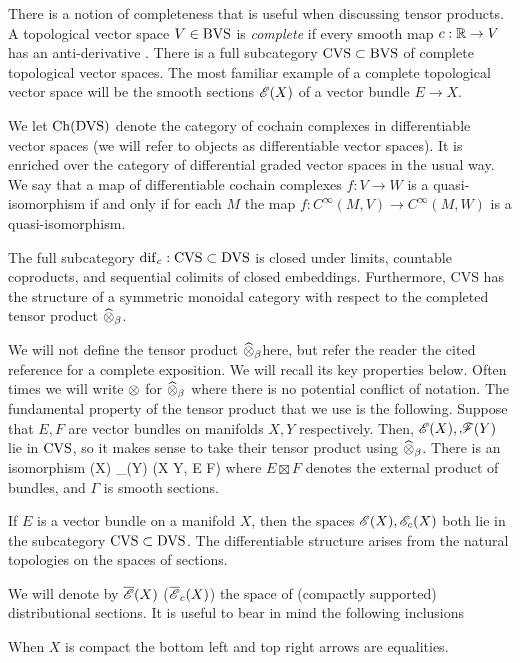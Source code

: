 There is a notion of completeness that is useful when discussing tensor products. 
A topological vector space $V \in {\rm BVS}$ is {\em complete} if every smooth map $c : \mathbb R \to V$ has an anti-derivative \cite{KM97}.
There is a full subcategory ${\rm CVS} \subset {\rm BVS}$ of complete topological vector spaces.
The most familiar example of a complete topological vector space will be the smooth sections $\mathscr E(X)$ of a vector bundle $E \to X$.

We let ${\rm Ch}({\rm DVS})$ denote the category of cochain complexes in differentiable vector spaces (we will refer to objects as differentiable vector spaces). 
It is enriched over the category of differential graded vector spaces in the usual way.
We say that a map of differentiable cochain complexes $f : V \to W$ is a quasi-isomorphism if and only if for each $M$ the map $f : C^\infty(M, V) \to C^\infty(M,W)$ is a quasi-isomorphism.

\begin{thm}
The full subcategory ${\rm dif}_c : {\rm CVS} \subset {\rm DVS}$ is closed under limits, countable coproducts, and sequential colimits of closed embeddings. 
Furthermore, {\rm CVS} has the structure of a symmetric monoidal category with respect to the completed tensor product $\widehat{\otimes}_{\beta}$. 
\end{thm}

We will not define the tensor product $\widehat{\otimes}_\beta$here, but refer the reader the cited reference for a complete exposition.
We will recall its key properties below.
Often times we will write $\otimes$ for $\widehat{\otimes}_\beta$ where there is no potential conflict of notation. 
The fundamental property of the tensor product that we use is the following.
Suppose that $E,F$ are vector bundles on manifolds $X,Y$ respectively.
Then, $\mathscr E(X), \mathscr F(Y)$ lie in ${\rm CVS}$, so it makes sense to take their tensor product using $\widehat{\otimes}_\beta$. 
There is an isomorphism
\be\label{tensor1}
\sE(X) \Hat{\tensor}_\beta \sF(Y) \cong \Gamma(X \times Y, E \boxtimes F)
\ee
where $E \boxtimes F$ denotes the external product of bundles, and $\Gamma$ is smooth sections. 

If $E$ is a vector bundle on a manifold $X$, then the spaces $\mathscr E(X), \mathscr E_c(X)$ both lie in the subcategory ${\rm CVS} \subset {\rm DVS}$. 
The differentiable structure arises from the natural topologies on the spaces of sections. 

We will denote by $\overline{\mathscr E}(X)$ ($\overline{\mathscr E}_c(X)$) the space of (compactly supported) distributional sections.
It is useful to bear in mind the following inclusions
\ben
{}
\een
When $X$ is compact the bottom left and top right arrows are equalities.

